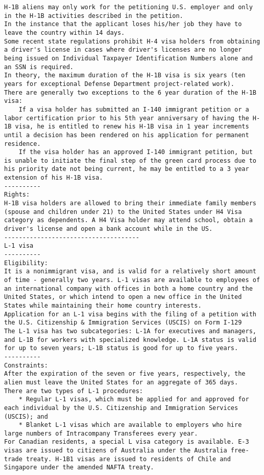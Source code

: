 \documentclass[oneside, article]{memoir}
\begin{document}
\begin{verbatim}
H-1B aliens may only work for the petitioning U.S. employer and only in the H-1B activities described in the petition.
In the instance that the applicant loses his/her job they have to leave the country within 14 days.
Some recent state regulations prohibit H-4 visa holders from obtaining a driver's license in cases where driver's licenses are no longer being issued on Individual Taxpayer Identification Numbers alone and an SSN is required.
In theory, the maximum duration of the H-1B visa is six years (ten years for exceptional Defense Department project-related work).
There are generally two exceptions to the 6 year duration of the H-1B visa:
    If a visa holder has submitted an I-140 immigrant petition or a labor certification prior to his 5th year anniversary of having the H-1B visa, he is entitled to renew his H-1B visa in 1 year increments until a decision has been rendered on his application for permanent residence.
    If the visa holder has an approved I-140 immigrant petition, but is unable to initiate the final step of the green card process due to his priority date not being current, he may be entitled to a 3 year extension of his H-1B visa.
----------
Rights:
H-1B visa holders are allowed to bring their immediate family members (spouse and children under 21) to the United States under H4 Visa category as dependents. A H4 Visa holder may attend school, obtain a driver's license and open a bank account while in the US.
-------------------------------------
L-1 visa
----------
Eligibility:
It is a nonimmigrant visa, and is valid for a relatively short amount of time - generally two years. L-1 visas are available to employees of an international company with offices in both a home country and the United States, or which intend to open a new office in the United States while maintaining their home country interests.
Application for an L-1 visa begins with the filing of a petition with the U.S. Citizenship & Immigration Services (USCIS) on Form I-129
The L-1 visa has two subcategories: L-1A for executives and managers, and L-1B for workers with specialized knowledge. L-1A status is valid for up to seven years; L-1B status is good for up to five years.
----------
Constraints:
After the expiration of the seven or five years, respectively, the alien must leave the United States for an aggregate of 365 days.
There are two types of L-1 procedures:
    * Regular L-1 visas, which must be applied for and approved for each individual by the U.S. Citizenship and Immigration Services (USCIS); and
    * Blanket L-1 visas which are available to employers who hire large numbers of Intracompany Transferees every year.
For Canadian residents, a special L visa category is available. E-3 visas are issued to citizens of Australia under the Australia free-trade treaty. H-1B1 visas are issued to residents of Chile and Singapore under the amended NAFTA treaty.


\end{verbatim}
\end{document}

